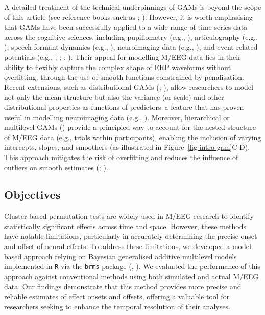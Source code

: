 \documentclass[
  doc,
  floatsintext,
  longtable,
  a4paper,
  nolmodern,
  notxfonts,
  notimes,
  donotrepeattitle,
  colorlinks=true,linkcolor=blue,citecolor=blue,urlcolor=blue]{apa7}
\begin{document}
A detailed treatment of the technical underpinnings of GAMs is beyond
the scope of this article (see reference books such as
;
). However, it is worth emphasising
that GAMs have been successfully applied to a wide range of time series
data across the cognitive sciences, including pupillometry (e.g.,
), articulography (e.g.,
), speech formant dynamics
(e.g., ), neuroimaging
data (e.g., ), and
event-related potentials (e.g., ; ;
,
). Their appeal for modelling M/EEG data
lies in their ability to flexibly capture the complex shape of ERP
waveforms without overfitting, through the use of smooth functions
constrained by penalisation. Recent extensions, such as distributional
GAMs (;
), allow researchers to
model not only the mean structure but also the variance (or scale) and
other distributional properties as functions of predictors--a feature
that has proven useful in modelling neuroimaging data (e.g.,
). Moreover, hierarchical or
multilevel GAMs () provide a principled way to account for the
nested structure of M/EEG data (e.g., trials within participants),
enabling the inclusion of varying intercepts, slopes, and smoothers (as
illustrated in Figure~\ref{fig-intro-gam}\ignorespaces C-D). This
approach mitigates the risk of overfitting and reduces the influence of
outliers on smooth estimates (; ).

\subsection{Objectives}\label{objectives}

Cluster-based permutation tests are widely used in M/EEG research to
identify statistically significant effects across time and space.
However, these methods have notable limitations, particularly in
accurately determining the precise onset and offset of neural effects.
To address these limitations, we developed a model-based approach
relying on Bayesian generalised additive multilevel models implemented
in \texttt{R} via the \texttt{brms} package
(, ).
We evaluated the performance of this approach against conventional
methods using both simulated and actual M/EEG data. Our findings
demonstrate that this method provides more precise and reliable
estimates of effect onsets and offsets, offering a valuable tool for
researchers seeking to enhance the temporal resolution of their
analyses.
\end{document}
